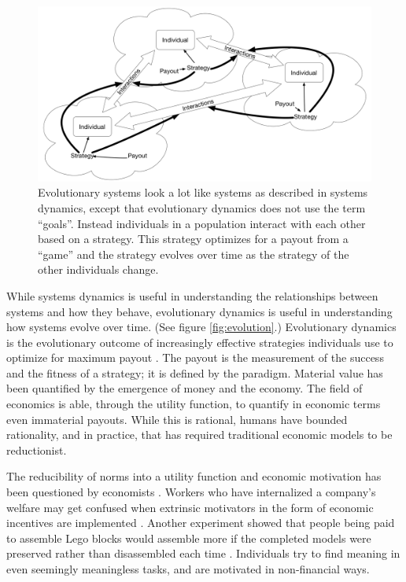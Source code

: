 \begin{figure}[h]
 \centering
 \includegraphics[width=1\textwidth]{pictures/EvolutionarySystem}
 \caption[Evolutionary dynamics version of interacting systems.]{Evolutionary systems look a lot like systems as described in systems dynamics, except that evolutionary dynamics does not use the term ``goals''. Instead individuals in a population interact with each other based on a strategy. This strategy optimizes for a payout from a ``game'' and the strategy evolves over time as the strategy of the other individuals change. \cite{nowak2006evolutionary}}
 \label{fig:evolution}
\end{figure}

While systems dynamics is useful in understanding the relationships between systems and how they behave, evolutionary dynamics is useful in understanding how systems evolve over time. (See figure \autoref{fig:evolution}.) Evolutionary dynamics is the evolutionary outcome of increasingly effective strategies individuals use to optimize for maximum payout \cite{nowak2006five, nowak2006evolutionary}. The payout is the measurement of the success and the fitness of a strategy; it is defined by the paradigm. Material value has been quantified by the emergence of money and the economy. The field of economics is able, through the utility function, to quantify in economic terms even immaterial payouts. While this is rational, humans have bounded rationality, and in practice, that has required traditional economic models to be reductionist.

The reducibility of norms into a utility function and economic motivation has been questioned by economists \cite{kreps1997intrinsic}. Workers who have internalized a company's welfare may get confused when extrinsic motivators in the form of economic incentives are implemented \cite{ichniowski1995effects}. Another experiment showed that people being paid to assemble Lego blocks would assemble more if the completed models were preserved rather than disassembled each time \cite{ariely2008man}. Individuals try to find meaning in even seemingly meaningless tasks, and are motivated in non-financial ways.

